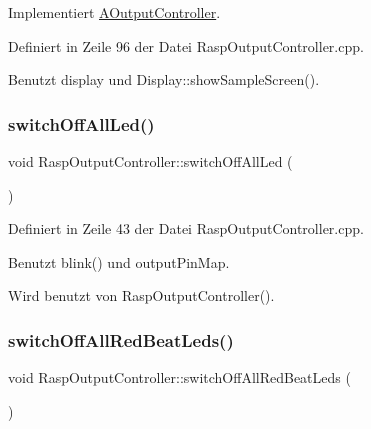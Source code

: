 Implementiert \hyperlink{class_a_output_controller_aab53d12a6aa6f38d0e4ead69e85ed4fe}{A\+Output\+Controller}.



Definiert in Zeile 96 der Datei Rasp\+Output\+Controller.\+cpp.



Benutzt display und Display\+::show\+Sample\+Screen().

\mbox{\label{class_rasp_output_controller_afdd3bcfa82341a9d2539233abe7cb617}} 
\subsubsection{\texorpdfstring{switch\+Off\+All\+Led()}{switchOffAllLed()}}
{\footnotesize\ttfamily void Rasp\+Output\+Controller\+::switch\+Off\+All\+Led (\begin{DoxyParamCaption}{ }\end{DoxyParamCaption})\hspace{0.3cm}{\ttfamily [private]}}



Definiert in Zeile 43 der Datei Rasp\+Output\+Controller.\+cpp.



Benutzt blink() und output\+Pin\+Map.



Wird benutzt von Rasp\+Output\+Controller().

\mbox{\label{class_rasp_output_controller_a9a5025e13e27544721a80e6725ed23e4}} 
\subsubsection{\texorpdfstring{switch\+Off\+All\+Red\+Beat\+Leds()}{switchOffAllRedBeatLeds()}}
{\footnotesize\ttfamily void Rasp\+Output\+Controller\+::switch\+Off\+All\+Red\+Beat\+Leds (\begin{DoxyParamCaption}{ }\end{DoxyParamCaption})\hspace{0.3cm}{\ttfamily [private]}}



